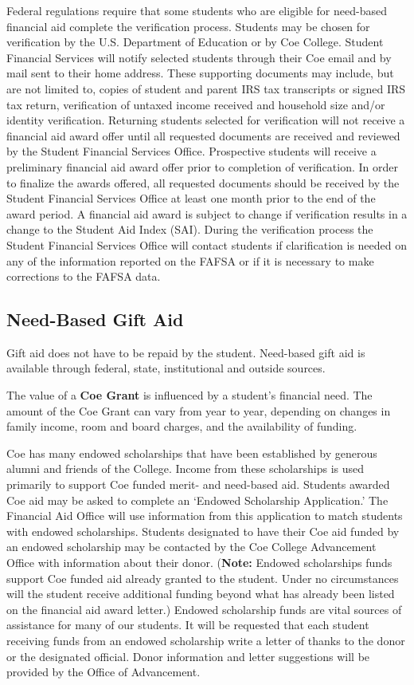 \documentclass[
  letterpaper,
]{scrbook}
\begin{document}
Federal regulations require that some students who are eligible for
need-based financial aid complete the verification process. Students may
be chosen for verification by the U.S. Department of Education or by Coe
College. Student Financial Services will notify selected students
through their Coe email and by mail sent to their home address. These
supporting documents may include, but are not limited to, copies of
student and parent IRS tax transcripts or signed IRS tax return,
verification of untaxed income received and household size and/or
identity verification. Returning students selected for verification will
not receive a financial aid award offer until all requested documents
are received and reviewed by the Student Financial Services Office.
Prospective students will receive a preliminary financial aid award
offer prior to completion of verification. In order to finalize the
awards offered, all requested documents should be received by the
Student Financial Services Office at least one month prior to the end of
the award period. A financial aid award is subject to change if
verification results in a change to the Student Aid Index (SAI). During
the verification process the Student Financial Services Office will
contact students if clarification is needed on any of the information
reported on the FAFSA or if it is necessary to make corrections to the
FAFSA data.

\subsection{Need-Based Gift Aid}\label{need-based-gift-aid}

Gift aid does not have to be repaid by the student. Need-based gift aid
is available through federal, state, institutional and outside sources.

The value of a \textbf{Coe Grant} is influenced by a student's financial
need. The amount of the Coe Grant can vary from year to year, depending
on changes in family income, room and board charges, and the
availability of funding.

Coe has many endowed scholarships that have been established by generous
alumni and friends of the College. Income from these scholarships is
used primarily to support Coe funded merit- and need-based aid. Students
awarded Coe aid may be asked to complete an `Endowed Scholarship
Application.' The Financial Aid Office will use information from this
application to match students with endowed scholarships. Students
designated to have their Coe aid funded by an endowed scholarship may be
contacted by the Coe College Advancement Office with information about
their donor. (\textbf{Note:} Endowed scholarships funds support Coe
funded aid already granted to the student. Under no circumstances will
the student receive additional funding beyond what has already been
listed on the financial aid award letter.) Endowed scholarship funds are
vital sources of assistance for many of our students. It will be
requested that each student receiving funds from an endowed scholarship
write a letter of thanks to the donor or the designated official. Donor
information and letter suggestions will be provided by the Office of
Advancement.
\end{document}

